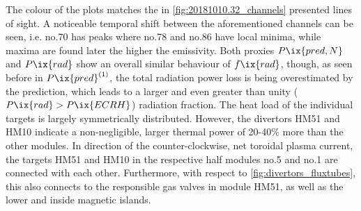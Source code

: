 The colour of the plots matches the in \cref{fig:20181010.32_channels} presented lines of sight. A noticeable temporal shift between the aforementioned channels can be seen, i.e. no.70 has peaks where no.78 and no.86 have local minima, while maxima are found later the higher the emissivity. Both proxies $P\ix{pred,N}$ and $P\ix{rad}$ show an overall similar behaviour of $f\ix{rad}$, though, as seen before in $P\ix{pred}^{\left(1\right)}$, the total radiation power loss is being overestimated by the prediction, which leads to a larger and even greater than unity ($P\ix{rad}>P\ix{ECRH}$) radiation fraction. The heat load of the individual targets is largely symmetrically distributed. However, the divertors HM51 and HM10 indicate a non-negligible, larger thermal power of 20-40\% more than the other modules. In direction of the counter-clockwise, net toroidal plasma current, the targets HM51 and HM10 in the respective half modules no.5 and no.1 are connected with each other. Furthermore, with respect to \cref{fig:divertors_fluxtubes}, this also connects to the responsible gas valves in module HM51, as well as the lower and inside magnetic islands.\\%
